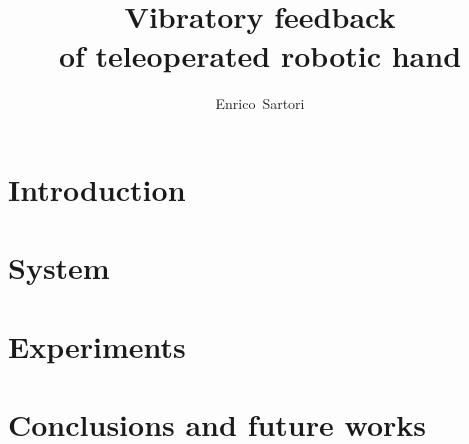 \documentclass[10pt,journal,compsoc]{IEEEtran}
\begin{document}
\title{Vibratory feedback \\of teleoperated robotic hand}

\author{Enrico~Sartori}




\maketitle

\IEEEdisplaynontitleabstractindextext

\IEEEpeerreviewmaketitle


\section{Introduction}
\label{sec:introduction}



\section{System}
\label{sec:system}



\section{Experiments}
\label{sec:experiments}



\section{Conclusions and future works}
\label{sec:conclusions}





\end{document}
